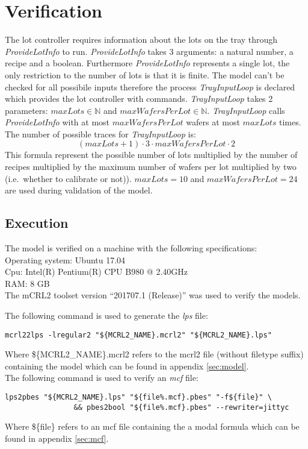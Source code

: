 \section{Verification}\label{sec:results}
The lot controller requires information about the lots on the tray through \textit{ProvideLotInfo} to run.
\textit{ProvideLotInfo} takes 3 arguments: a natural number, a recipe and a boolean.
Furthermore \textit{ProvideLotInfo} represents a single lot, the only restriction to the number of lots is that it is finite.
The model can't be checked for all possibile inputs therefore the process \textit{TrayInputLoop} is declared which provides the lot controller with  commands.
\textit{TrayInputLoop} takes 2 parameters: $\mathit{maxLots} \in \mathbb{N}$ and $\mathit{maxWafersPerLot} \in \mathbb{N}$.
\textit{TrayInputLoop} calls \textit{ProvideLotInfo} with at most $\mathit{maxWafersPerLot}$ wafers at most $\mathit{maxLots}$ times.
The number of possible traces for \textit{TrayInputLoop} is:
$$(\mathit{maxLots}+1) \cdot 3 \cdot \mathit{maxWafersPerLot} \cdot 2$$
This formula represent the possible number of lots multiplied by the number of recipes multiplied by the maximum number of wafers per lot multiplied by two (i.e.\ whether to calibrate or not)). $\mathit{maxLots} = 10$ and $\mathit{maxWafersPerLot} = 24$ are used during validation of the model.

\subsection{Execution}
The model is verified on a machine with the following specifications:\\
Operating system: Ubuntu 17.04\\
Cpu: Intel(R) Pentium(R) CPU B980 @ 2.40GHz\\
RAM: 8 GB\\

The mCRL2 toolset version ``201707.1 (Release)'' was used to verify the models.

The following command is used to generate the \textit{lps} file:\\
\begin{lstlisting}[style=sh,caption={mcrl22lps}] 
mcrl22lps -lregular2 "${MCRL2_NAME}.mcrl2" "${MCRL2_NAME}.lps"
\end{lstlisting}
Where \$\{MCRL2\_NAME\}.mcrl2 refers to the mcrl2 file (without filetype suffix) containing the model which can be found in appendix \ref{sec:model}.\\
The following command is used to verify an \textit{mcf} file:\\
\begin{lstlisting}[style=sh,caption={mcf check}] 
lps2pbes "${MCRL2_NAME}.lps" "${file%.mcf}.pbes" "-f${file}" \
                && pbes2bool "${file%.mcf}.pbes" --rewriter=jittyc
\end{lstlisting}
Where \$\{file\} refers to an mcf file containing the a modal formula which can be found in appendix \ref{sec:mcf}.\\
